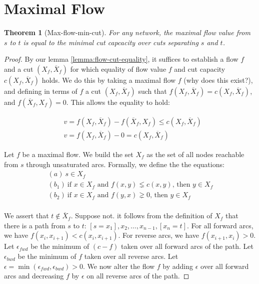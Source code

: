 \documentclass[titlepage]{article}
\newcommand{\eps}{\ensuremath{\epsilon}}
\newcommand{\Xbar}{\ensuremath{\overline{X}}}
\theoremstyle{plain}
\newtheorem{theorem}{Theorem}
\theoremstyle{definition}
\theoremstyle{remark}
\begin{document}
\section{Maximal Flow}
\begin{theorem}[Max-flow-min-cut]
    For any network, the maximal flow value from $s$ to $t$ is equal to the 
    minimal cut capcacity over cuts separating $s$ and $t$.
\end{theorem}
\begin{proof}
By our lemma \ref{lemma:flow-cut-equality}, it suffices to establish
a flow $f$ and a cut $(X_f, \Xbar_f)$ for which equality of
flow value $f$ and cut capacity $c(X_f, \Xbar_f)$ holds. We do this
by taking a maximal flow $f$ (why does this exist?), and defining
in terms of $f$ a cut $(X_f, \Xbar_f)$ such that $f(X_f, \Xbar_f) = c(X_f, \Xbar_f)$,
and $f(\Xbar_f, X_f) = 0$. This allows the equality to hold:

\begin{align*}
&v = f(X_f, \Xbar_f) - f(\Xbar_f, X_f) \leq c(X_f, \Xbar_f) \\
&v = f(X_f, \Xbar_f) - 0 = c(X_f, \Xbar_f)
\end{align*}

Let $f$ be a maximal flow. We build the set $X_f$ as the set of all nodes
reachable from $s$ through unsaturated arcs. Formally, we define the
the equations:
\begin{align*}
    &(a) ~ s \in X_f \\
    &(b_1) ~ \text{if $x \in X_f$ and $f(x, y) \lneq c(x, y)$, then $y \in X_f$ } \\
    &(b_2) ~ \text{if $x \in X_f$ and $f(y, x) \gneq 0$, then $y \in X_f$ } \\
\end{align*}

We assert that $t \not \in \Xbar_f$. Suppose not. it follows from the definition of $X_f$
that there is a path from $s$ to $t$: $[s = x_1], x_2, \dots, x_{n-1}, [x_n = t]$.
For all forward arcs, we have $f(x_i, x_{i+1}) < c(x_i, x_{i+1})$. For reverse
arcs, we have $f(x_{i+1}, x_i) > 0$. Let $\eps_{fwd}$ be the minimum of 
$(c - f)$ taken over all forward arcs of the path. Let $\eps_{bwd}$ be the
minimum of $f$ taken over all reverse arcs. Let $\eps = \min(\eps_{fwd}, \eps_{bwd}) > 0$.
We now alter the flow $f$ by adding $\eps$ over all forward arcs and decreasing
$f$ by $\eps$ on all reverse arcs of the path.

\end{proof}




\nocite{*}
\end{document}
